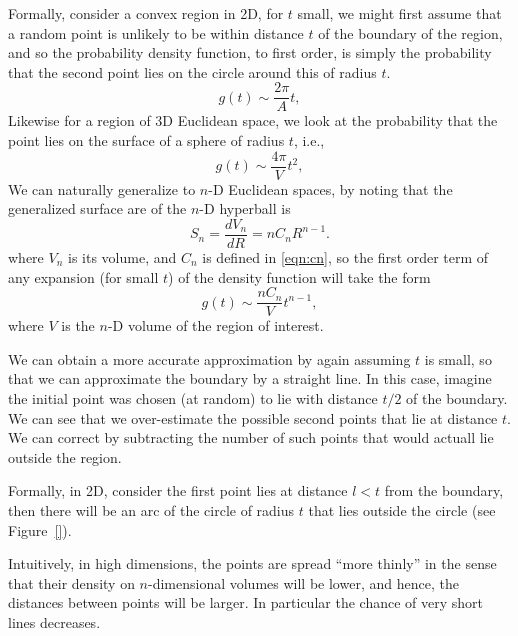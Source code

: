 \documentclass{article}
\begin{document}
Formally, consider a convex region in 2D, for $t$ small, we might
first assume that a random point is unlikely to be within distance $t$
of the boundary of the region, and so the probability density
function, to first order, is simply the probability that the second
point lies on the circle around this of radius $t$.
\begin{equation}
  g(t) \sim \frac{2 \pi}{A} t, 
\end{equation}
Likewise for a region of 3D Euclidean space, we look at the
probability that the point lies on the surface of a sphere of radius
$t$, i.e.,
\begin{equation}
  g(t) \sim \frac{4 \pi}{V} t^2, 
\end{equation}
We can naturally generalize to $n$-D Euclidean spaces, by noting that
the generalized surface are of the $n$-D hyperball is
\begin{equation}
  \label{eq:surface_hyperball}
  S_{n} = \frac{dV_n}{dR} = n C_n R^{n-1}.
\end{equation}
where $V_n$ is its volume, and $C_n$ is defined in \eqref{eqn:cn}, so
the first order term of any expansion (for small $t$) of the density
function will take the form
\begin{equation}
  g(t) \sim \frac{n C_n}{V} t^{n-1}, 
\end{equation}
where $V$ is the $n$-D volume of the region of interest.

We can obtain a more accurate approximation by again assuming $t$ is
small, so that we can approximate the boundary by a straight line. In
this case, imagine the initial point was chosen (at random) to lie
with distance $t/2$ of the boundary. We can see that we over-estimate
the possible second points that lie at distance $t$. We can correct by
subtracting the number of such points that would actuall lie outside
the region.

Formally, in 2D, consider the first point lies at distance $l<t$ from
the boundary, then there will be an arc of the circle of radius $t$
that lies outside the circle (see Figure~\ref{}). 







Intuitively, in high dimensions, the points are spread ``more
thinly'' in the sense that their density on $n$-dimensional volumes
will be lower, and hence, the distances between points will be
larger. In particular the chance of very short lines decreases.
\end{document}
